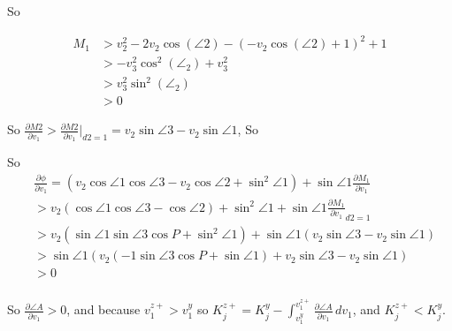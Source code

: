 So

\begin{equation}
  \begin{aligned}
    M_1 
    &> 
    v_2^{2} - 2 v_2 \cos{\left(\angle{2} \right)} - \left(- v_2 \cos{\left(\angle{2} \right)} + 1\right)^{2} + 1 \\
    &> 
    - v_{3}^{2} \cos^{2}{\left(\angle_{2} \right)} + v_{3}^{2} \\
    &> 
    v_{3}^{2} \sin^{2}{\left(\angle_{2} \right)} \\
    &> 
    0
  \end{aligned}
\end{equation}

So $\frac{\partial M2}{\partial v_1}> \frac{\partial M2}{\partial v_1} |_{d2=1} = v_2 \sin\angle 3 -v_2\sin \angle 1$, So 

So
\begin{equation}
  \begin{aligned}
    & \frac{\partial \phi}{\partial v_1}
    =\left(
      v_2 \cos{\angle{1} } \cos{\angle{3} } 
      -
      v_2 \cos{\angle{2} } 
      + 
      \sin^{2}{\angle{1} } 
    \right)
    +
    \sin{\angle{1}}
    \frac{\partial M_1}{\partial v_1}\\
    &>
    v_2
    \left(
       \cos{\angle{1} } \cos{\angle{3} } 
      -
      \cos{\angle{2} } 
    \right)
    + 
      \sin^{2}{\angle{1} } 
    +
    \sin{\angle{1}}
    {\frac{\partial M_1}{\partial v_1}}_{d2=1}\\
    &>
    v_2
    \left(
      \sin{\angle{1} } \sin{\angle{3} } \cos P
      + 
      \sin^{2}{\angle{1} } 
    \right)
    +
    \sin{\angle{1}}
    (v_2 \sin\angle 3 -v_2\sin \angle 1)\\
    &>
    \sin{\angle{1} }
    \left( 
      v_2
      \left(
        -1\sin{\angle{3} } \cos P
        + 
        \sin{\angle{1} } 
        \right)
        +
       v_2 \sin\angle 3 -v_2\sin \angle 1
    \right) \\
    &> 0\\
      \end{aligned}
\end{equation}

So $\frac{\partial \angle A}{\partial v_1}>0$, and 
because $v_1^{z+}>v_1^{y}$ so $K_j^{z+} = K_j^{y} - \int_{v_1^{y}}^{v_1^{z+}} \frac{\partial \angle A}{\partial v_1} \,d v_1 $, and $K_j^{z+}<K_j^{y}$.








